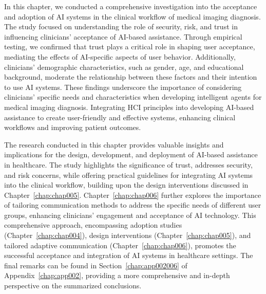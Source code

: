 In this chapter, we conducted a comprehensive investigation into the acceptance and adoption of \ac{AI} systems in the clinical workflow of medical imaging diagnosis.
The study focused on understanding the role of security, risk, and trust in influencing clinicians' acceptance of \ac{AI}-based assistance.
Through empirical testing, we confirmed that trust plays a critical role in shaping user acceptance, mediating the effects of \ac{AI}-specific aspects of user behavior.
Additionally, clinicians' demographic characteristics, such as gender, age, and educational background, moderate the relationship between these factors and their intention to use \ac{AI} systems.
These findings underscore the importance of considering clinicians' specific needs and characteristics when developing intelligent agents for medical imaging diagnosis.
Integrating \ac{HCI} principles into developing \ac{AI}-based assistance to create user-friendly and effective systems, enhancing clinical workflows and improving patient outcomes.

The research conducted in this chapter provides valuable insights and implications for the design, development, and deployment of \ac{AI}-based assistance in healthcare.
The study highlights the significance of trust, addresses security, and risk concerns, while offering practical guidelines for integrating \ac{AI} systems into the clinical workflow, building upon the design interventions discussed in Chapter~\ref{chap:chap005}.
Chapter~\ref{chap:chap006} further explores the importance of tailoring communication methods to address the specific needs of different user groups, enhancing clinicians' engagement and acceptance of \ac{AI} technology.
This comprehensive approach, encompassing adoption studies (Chapter~\ref{chap:chap004}), design interventions (Chapter~\ref{chap:chap005}), and tailored adaptive communication (Chapter~\ref{chap:chap006}), promotes the successful acceptance and integration of \ac{AI} systems in healthcare settings.
The final remarks can be found in Section~\ref{chap:app002006} of Appendix~\ref{chap:app002}, providing a more comprehensive and in-depth perspective on the summarized conclusions.